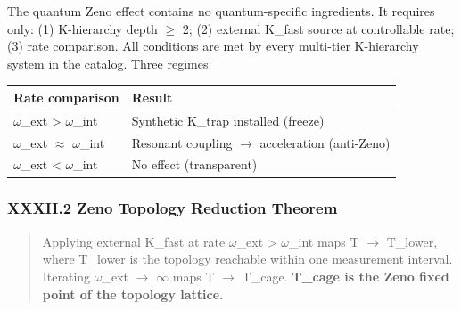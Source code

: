 \documentclass[12pt,a4paper]{article}
\begin{document}
The quantum Zeno effect contains no quantum-specific ingredients. It requires only: (1) K-hierarchy depth $\geq$ 2; (2) external K\_fast source at controllable rate; (3) rate comparison. All conditions are met by every multi-tier K-hierarchy system in the catalog. Three regimes:

\begin{table}[htbp]
\centering
\small
{}
\begin{tabularx}{\textwidth}{>{\centering\arraybackslash}X >{\centering\arraybackslash}X}
\toprule
\rowcolor{gray!25}\textbf{Rate comparison} & \textbf{Result} \\
\midrule
\rowcolors{1}{white}{gray!10}
$\omega$\_ext \textgreater{} $\omega$\_int & Synthetic K\_trap installed (freeze) \\
$\omega$\_ext $\approx$ $\omega$\_int & Resonant coupling $\rightarrow$ acceleration (anti-Zeno) \\
$\omega$\_ext \textless{} $\omega$\_int & No effect (transparent) \\
\bottomrule
\end{tabularx}
\end{table}

\subsubsection{XXXII.2 Zeno Topology Reduction Theorem}

\begin{quote}
Applying external K\_fast at rate $\omega$\_ext \textgreater{} $\omega$\_int maps T $\rightarrow$ T\_lower, where T\_lower is the topology reachable within one measurement interval. Iterating $\omega$\_ext $\rightarrow$ $\infty$ maps T $\rightarrow$ T\_cage. \textbf{T\_cage is the Zeno fixed point of the topology lattice.}

\end{quote}
\end{document}
